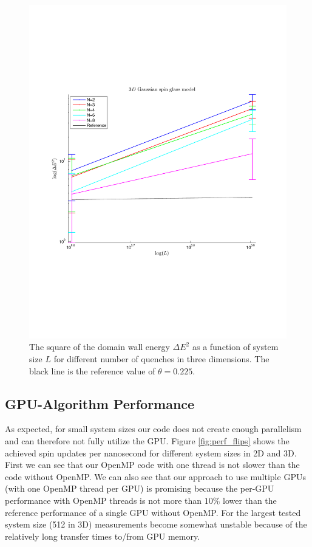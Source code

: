 \documentclass[paper=a4, fontsize=11pt]{scrartcl} %
\numberwithin{equation}{section} %
\numberwithin{figure}{section} %
\numberwithin{table}{section} %
\begin{document}
\begin{figure}
\centering
\includegraphics[width=\textwidth]{images/spinglass3D_small.pdf}
\caption{The square of the domain wall energy $\Delta E ^ 2$ as a function of system size $L$ for different number of quenches in three dimensions. The black line is the reference value of $\theta=0.225$.}
\label{fig:E_3D_small}
\end{figure}

\subsection{GPU-Algorithm Performance}
As expected, for small system sizes our code does not create enough parallelism and can therefore not fully utilize the GPU. Figure \ref{fig:perf_flips} shows the achieved spin updates per nanosecond for different system sizes in 2D and 3D. First we can see that our OpenMP code with one thread is not slower than the code without OpenMP. We can also see that our approach to use multiple GPUs (with one OpenMP thread per GPU) is promising because the per-GPU performance with OpenMP threads is not more than $10\%$ lower than the reference performance of a single GPU without OpenMP. For the largest tested system size (512 in 3D) measurements become somewhat unstable because of the relatively long transfer times to/from GPU memory.
\end{document}
